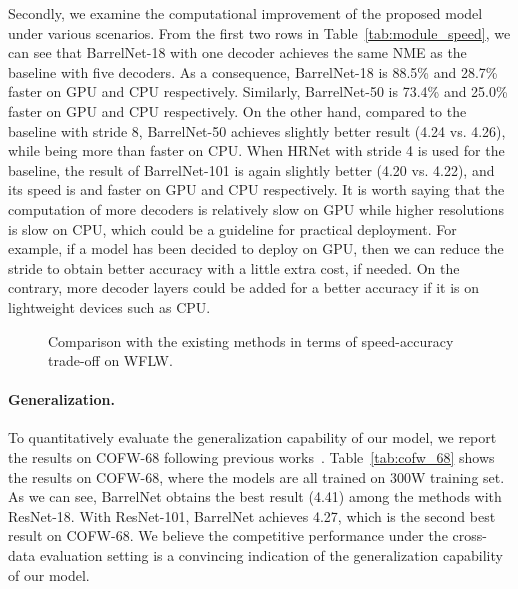 \documentclass{article}
\begin{document}
Secondly, we examine the computational improvement of the proposed model under various scenarios. From the first two rows in Table~\ref{tab:module_speed}, we can see that BarrelNet-18 with one decoder achieves the same NME as the baseline with five decoders. As a consequence, BarrelNet-18 is 88.5\% and 28.7\% faster on GPU and CPU respectively. Similarly, BarrelNet-50 is 73.4\% and 25.0\% faster on GPU and CPU respectively. On the other hand, compared to the baseline with stride 8, BarrelNet-50 achieves slightly better result (4.24 vs. 4.26), while being more than  faster on CPU. When HRNet with stride 4 is used for the baseline, the result of BarrelNet-101 is again slightly better (4.20 vs. 4.22), and its speed is  and  faster on GPU and CPU respectively. It is worth saying that the computation of more decoders is relatively slow on GPU while higher resolutions is slow on CPU, which could be a guideline for practical deployment. For example, if a model has been decided to deploy on GPU, then we can reduce the stride to obtain better accuracy with a little extra cost, if needed. On the contrary, more decoder layers could be added for a better accuracy if it is on lightweight devices such as CPU. 

\begin{figure}
\centering
    \vspace{-3mm}
    \caption{Comparison with the existing methods in terms of speed-accuracy trade-off on WFLW. \label{fig:speed}}
\end{figure}

\paragraph{Generalization.}

To quantitatively evaluate the generalization capability of our model, we report the results on COFW-68 following previous works~\citep{WQY18,ZSZ19,QSW19,JLS20,LLZ20}. Table~\ref{tab:cofw_68} shows the results on COFW-68, where the models are all trained on 300W training set. As we can see, BarrelNet obtains the best result (4.41) among the methods with ResNet-18. With ResNet-101, BarrelNet achieves 4.27, which is the second best result on COFW-68. We believe the competitive performance under the cross-data evaluation setting is a convincing indication of the generalization capability of our model.
\end{document}
